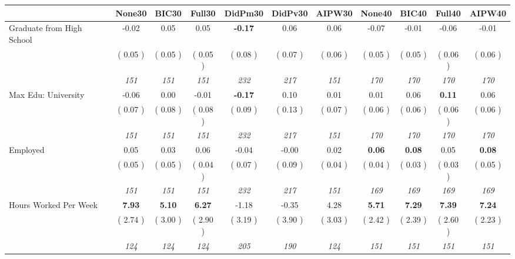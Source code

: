 \begin{tabular}{l c c c c c c c c c c}
\toprule
 & None30 & BIC30 & Full30 & DidPm30 & DidPv30 & AIPW30 & None40 & BIC40 & Full40 & AIPW40 \\
\midrule
Graduate from High School &     -0.02 &      0.05 &      0.05 & \textbf{     -0.17 } &      0.06 &      0.06 &     -0.07 &     -0.01 &     -0.06 &     -0.01 \\
& (     0.05 ) & (     0.05 ) & (     0.05 ) & (     0.08 ) & (     0.07 ) & (     0.06 ) & (     0.05 ) & (     0.05 ) & (     0.06 ) & (     0.06 ) \\
& \textit{ 151 } & \textit{ 151 } & \textit{ 151 } & \textit{ 232 } & \textit{ 217 } & \textit{ 151 } & \textit{ 170 } & \textit{ 170 } & \textit{ 170 } & \textit{ 170 } \\
Max Edu: University &     -0.06 &      0.00 &     -0.01 & \textbf{     -0.17 } &      0.10 &      0.01 &      0.01 &      0.06 & \textbf{      0.11 } &      0.06 \\
& (     0.07 ) & (     0.08 ) & (     0.08 ) & (     0.09 ) & (     0.13 ) & (     0.07 ) & (     0.06 ) & (     0.06 ) & (     0.06 ) & (     0.06 ) \\
& \textit{ 151 } & \textit{ 151 } & \textit{ 151 } & \textit{ 232 } & \textit{ 217 } & \textit{ 151 } & \textit{ 170 } & \textit{ 170 } & \textit{ 170 } & \textit{ 170 } \\
Employed &      0.05 &      0.03 &      0.06 &     -0.04 &     -0.00 &      0.02 & \textbf{      0.06 } & \textbf{      0.08 } &      0.05 & \textbf{     0.08} \\
& (     0.05 ) & (     0.05 ) & (     0.04 ) & (     0.07 ) & (     0.09 ) & (     0.04 ) & (     0.04 ) & (     0.03 ) & (     0.03 ) & (     0.05 ) \\
& \textit{ 151 } & \textit{ 151 } & \textit{ 151 } & \textit{ 232 } & \textit{ 217 } & \textit{ 151 } & \textit{ 169 } & \textit{ 169 } & \textit{ 169 } & \textit{ 169 } \\
Hours Worked Per Week & \textbf{      7.93 } & \textbf{      5.10 } & \textbf{      6.27 } &     -1.18 &     -0.35 &      4.28 & \textbf{      5.71 } & \textbf{      7.29 } & \textbf{      7.39 } & \textbf{     7.24} \\
& (     2.74 ) & (     3.00 ) & (     2.90 ) & (     3.19 ) & (     3.90 ) & (     3.03 ) & (     2.42 ) & (     2.39 ) & (     2.60 ) & (     2.23 ) \\
& \textit{ 124 } & \textit{ 124 } & \textit{ 124 } & \textit{ 205 } & \textit{ 190 } & \textit{ 124 } & \textit{ 151 } & \textit{ 151 } & \textit{ 151 } & \textit{ 151 } \\

\end{tabular}
